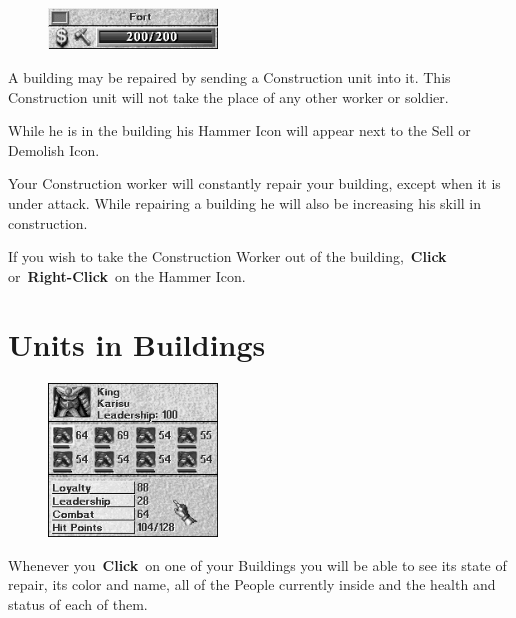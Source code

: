 \begin{figure}
	\vspace{-20pt}
	\begin{center}
		\includegraphics[width=0.4\textwidth]{Irepair_building}
	\end{center}
	\vspace{-20pt}
\end{figure}

A building may be repaired by sending a Construction unit into it. This Construction unit will not take the place of any other worker or soldier.

While he is in the building his Hammer Icon will appear next to the Sell or Demolish Icon.

Your Construction worker will constantly repair your building, except when it is under attack. While repairing a building he will also be increasing his skill in construction.

If you wish to take the Construction Worker out of the building, \textbf{Click} or \textbf{Right-Click} on the Hammer Icon.

\section{Units in Buildings}


\begin{figure}
	\vspace{-20pt}
	\begin{center}
		\includegraphics[width=0.4\textwidth]{Ifullfort}
	\end{center}
	\vspace{-20pt}
\end{figure}

Whenever you \textbf{Click} on one of your Buildings you will be able to see its state of repair, its color and name, all of the People currently inside and the health and status of each of them.


